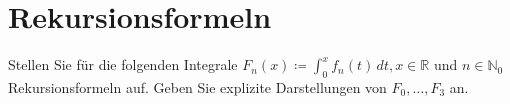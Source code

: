 \documentclass{article}
\begin{document}
\section*{Rekursionsformeln}

Stellen Sie für die folgenden Integrale
$F_n (x) \coloneqq \int_0^x f_n(t) \,dt, x \in \mathbb{R}$ und
$n \in \mathbb{N}_0$ Rekursionsformeln auf.
Geben Sie explizite Darstellungen von $F_0, \ldots, F_3$ an.

  
\end{document}
